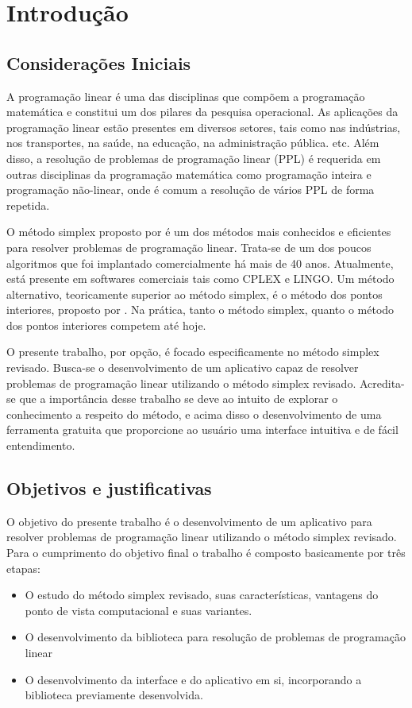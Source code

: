 \chapter{Introdução}

\section{Considerações Iniciais}
A programação linear é uma das disciplinas que compõem a programação matemática e constitui um dos pilares da pesquisa operacional. As aplicações da programação linear estão presentes em diversos setores, tais como nas indústrias, nos transportes, na saúde, na educação, na administração pública. etc.  Além disso, a resolução de problemas de programação linear (PPL) é requerida em outras disciplinas da programação matemática como programação inteira e programação não-linear, onde é comum a resolução de vários PPL de forma repetida.

O método simplex proposto por  é um dos métodos mais conhecidos e eficientes para resolver problemas de programação linear. Trata-se de um dos poucos algoritmos que foi implantado comercialmente há mais de 40 anos. Atualmente, está presente em softwares comerciais tais como CPLEX e LINGO. Um método alternativo, teoricamente superior ao método simplex, é o método dos pontos interiores, proposto por . Na prática, tanto o método simplex, quanto o método dos pontos interiores competem até hoje.  

O presente trabalho, por opção, é focado especificamente no método simplex revisado. Busca-se o desenvolvimento de um aplicativo capaz de resolver problemas de programação linear utilizando o método simplex revisado. Acredita-se que a importância desse trabalho se deve ao intuito de explorar o conhecimento a respeito do método, e acima disso o desenvolvimento de uma ferramenta gratuita que proporcione ao usuário uma interface intuitiva e de fácil entendimento.

\section{Objetivos e justificativas}
O objetivo do presente trabalho é o desenvolvimento de um aplicativo para resolver problemas de programação linear utilizando o método simplex revisado. Para o cumprimento do objetivo final o trabalho é composto basicamente por três etapas: 

\begin{itemize}
\item O estudo do método simplex revisado, suas características, vantagens do ponto de vista computacional e suas variantes.
\item O desenvolvimento da biblioteca para resolução de problemas de programação linear
\item O desenvolvimento da interface e do aplicativo em si, incorporando a biblioteca previamente desenvolvida.
\end{itemize}


